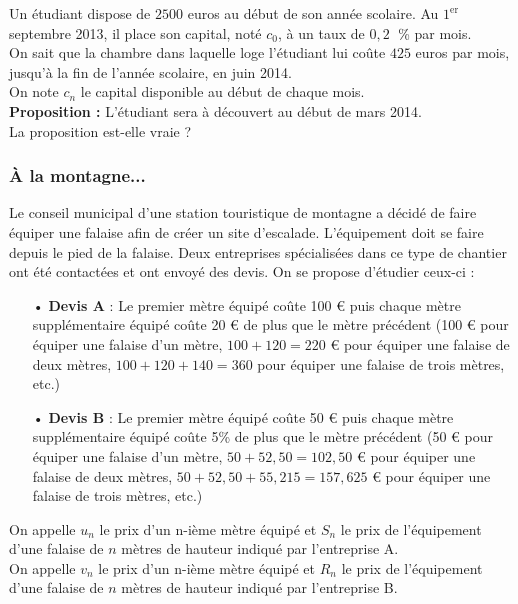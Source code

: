 Un étudiant dispose de $2500$ euros au début de son année scolaire. Au $1^{\mathrm{er}}$ septembre 2013, il place son capital, noté $c_0$, à un taux de $0,2 \;$ \% par mois. \\

On sait que la chambre dans laquelle loge l'étudiant lui coûte $425$ euros par mois, jusqu'à la fin de l'année scolaire, en juin 2014. \\

On note $c_n$ le capital disponible au début de chaque mois. \\

\textbf{Proposition :} L'étudiant sera à découvert au début de mars 2014. \\

La proposition est-elle vraie ? \\

\newpage

\subsubsection{À la montagne...}

Le conseil municipal d'une station touristique de montagne a décidé de faire équiper une falaise afin de créer un site d'escalade. L'équipement doit se faire depuis le pied de la falaise. Deux entreprises spécialisées dans ce type de chantier ont été contactées et ont envoyé des devis. On se propose d'étudier ceux-ci : \\

\begin{itemize}
\item[•] \textbf{Devis A} : Le premier mètre équipé coûte 100 € puis chaque mètre supplémentaire équipé coûte 20 € de plus que le mètre précédent (100 € pour équiper une falaise d'un mètre, $100 + 120 = 220$ € pour équiper une falaise de deux mètres, $100 + 120 + 140 = 360$ pour équiper une falaise de trois mètres, etc.) \\
\item[•] \textbf{Devis B} : Le premier mètre équipé coûte 50 € puis chaque mètre supplémentaire équipé coûte 5\% de plus que le mètre précédent (50 € pour équiper une falaise d'un mètre, $50 + 52,50 = 102,50$ € pour équiper une falaise de deux mètres, $50 + 52,50 + 55,215 = 157,625$ € pour équiper une falaise de trois mètres, etc.) \\
\end{itemize}

On appelle $u_n$ le prix d'un n-ième mètre équipé et $S_n$ le prix de l'équipement d'une falaise de $n$ mètres de hauteur indiqué par l'entreprise A. \\
On appelle $v_n$ le prix d'un n-ième mètre équipé et $R_n$ le prix de l'équipement d'une falaise de $n$ mètres de hauteur indiqué par l'entreprise B. \\

